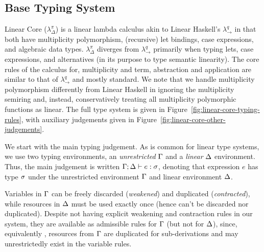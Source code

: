\documentclass[acmsmall,review,anonymous,screen]{acmart}
\begin{document}
% 

\subsection{Base Typing System\label{sec:base-calculi}}

Linear Core ($\lambda^\pi_\Delta$) is a linear lambda calculus akin to Linear
Haskell's $\lambda^q_\to$ in that both have multiplicity polymorphism,
(recursive) let bindings, case expressions, and algebraic data types.
$\lambda^\pi_\Delta$ diverges from $\lambda^q_\to$ primarily when typing lets,
case expressions, and alternatives (in its purpose to type semantic linearity).
%
%
%
The core rules of the calculus for, multiplicity and term,
abstraction and application are similar to that of $\lambda^q_\to$ and
mostly standard. 
We note that we handle multiplicity polymorphism differently from
Linear Haskell in ignoring the multiplicity semiring and, instead,
conservatively treating all multiplicity polymorphic functions as linear.
%
The full type system is given in Figure~\ref{fig:linear-core-typing-rules},
with auxiliary judgements given in
Figure~\ref{fig:linear-core-other-judgements}.

\TypingRules
\TypingRulesOther

We start with the main typing judgement.
As is common for linear type
systems, we use two typing environments, an \emph{unrestricted} $\Gamma$ and
a \emph{linear} $\Delta$ environment.
Thus, the main judgement is written $\Gamma;\Delta \vdash e :
\sigma$,
denoting that expression $e$ has type $\sigma$ under
the unrestricted environment $\Gamma$ and linear environment $\Delta$.

%
Variables in $\Gamma$ can be freely discarded (\emph{weakened}) and
duplicated (\emph{contracted}), while resources in $\Delta$ must be used
exactly once (hence can't be discarded nor duplicated). Despite not
having explicit weakening and contraction rules in our system, they
are available as admissible rules for $\Gamma$ (but not for $\Delta$), since,
equivalently \cite{91621fae-5e53-3497-8291-32b2fab5a743}, resources
from $\Gamma$ are duplicated for sub-derivations and may unrestrictedly
exist in the variable rules.
%
\end{document}
